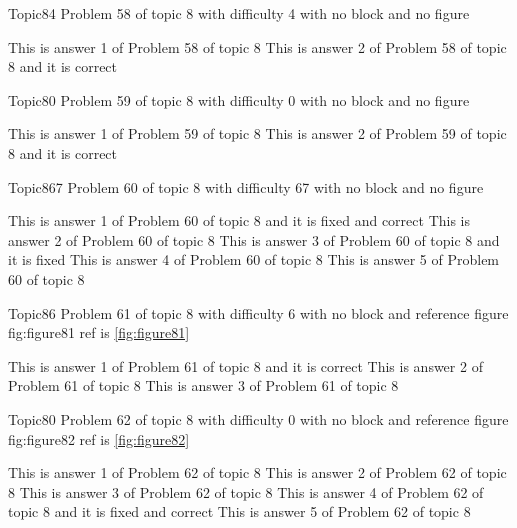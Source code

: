 \documentclass[master]{exam}
\begin{document}
\begin{problem}{Topic8}{4}
	Problem 58 of topic 8 with difficulty 4 with no block and no figure
	\begin{answers}
		\answer This is answer 1 of Problem 58 of topic 8 
		\answer[correct] This is answer 2 of Problem 58 of topic 8 and it is correct
	\end{answers}
\end{problem}

\begin{problem}{Topic8}{0}
	Problem 59 of topic 8 with difficulty 0 with no block and no figure
	\begin{answers}
		\answer This is answer 1 of Problem 59 of topic 8 
		\answer[correct] This is answer 2 of Problem 59 of topic 8 and it is correct
	\end{answers}
\end{problem}

\begin{problem}{Topic8}{67}
	Problem 60 of topic 8 with difficulty 67 with no block and no figure
	\begin{answers}
		 This is answer 1 of Problem 60 of topic 8 and it is fixed and correct
		\answer This is answer 2 of Problem 60 of topic 8 
		\answer[fixed] This is answer 3 of Problem 60 of topic 8 and it is fixed
		\answer This is answer 4 of Problem 60 of topic 8 
		\answer This is answer 5 of Problem 60 of topic 8 
	\end{answers}
\end{problem}

\begin{problem}{Topic8}{6}
	Problem 61 of topic 8 with difficulty 6 with no block and reference figure fig:figure81 ref is \ref{fig:figure81}
	\begin{answers}
		\answer[correct] This is answer 1 of Problem 61 of topic 8 and it is correct
		\answer This is answer 2 of Problem 61 of topic 8 
		\answer This is answer 3 of Problem 61 of topic 8 
	\end{answers}
\end{problem}

\begin{problem}{Topic8}{0}
	Problem 62 of topic 8 with difficulty 0 with no block and reference figure fig:figure82 ref is \ref{fig:figure82}
	\begin{answers}
		\answer This is answer 1 of Problem 62 of topic 8 
		\answer This is answer 2 of Problem 62 of topic 8 
		\answer This is answer 3 of Problem 62 of topic 8 
		 This is answer 4 of Problem 62 of topic 8 and it is fixed and correct
		\answer This is answer 5 of Problem 62 of topic 8 
	\end{answers}
\end{problem}
\end{document}
